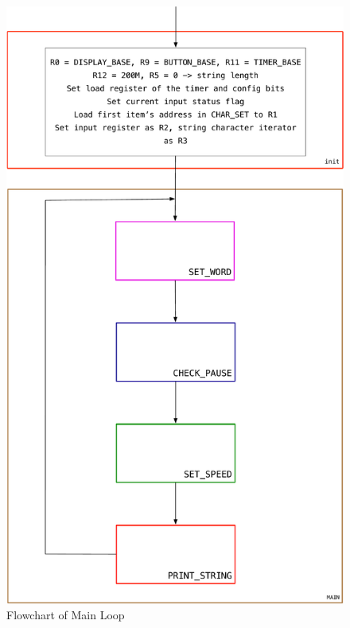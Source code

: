 \documentclass[titlepage]{article}
\begin{document}
	\begin{figure}[h]
		\centering
		\includegraphics[scale=.4]{../images/main.pdf}
		\caption{Flowchart of Main Loop}
	\end{figure}
 	\newpage
\end{document}
